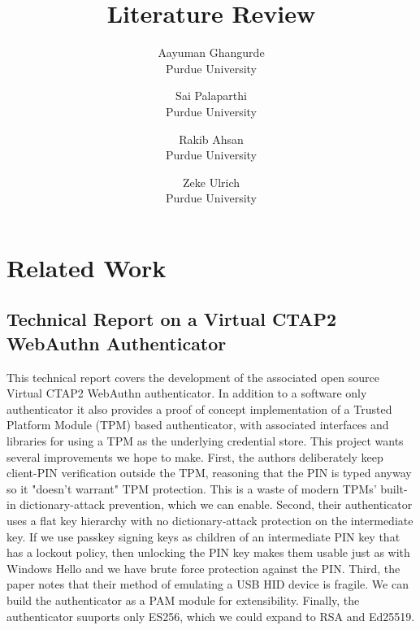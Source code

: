 \documentclass[letterpaper,twocolumn,10pt]{article}
\begin{document}

\date{}

\title{\Large \bf Literature Review}

\author{
  {\rm Aayuman Ghangurde}\\
  Purdue University
  \and
  {\rm Sai Palaparthi}\\
  Purdue University
  \and
  {\rm Rakib Ahsan}\\
  Purdue University
  \and
  {\rm Zeke Ulrich}\\
  Purdue University
}

\maketitle

\section{Related Work}

\subsection{Technical Report on a Virtual CTAP2 WebAuthn Authenticator~\cite{culnane2021virtualctap2webauthn}}

This technical report covers the development of the associated open source
Virtual CTAP2 WebAuthn authenticator. In addition to
a software only authenticator it also provides a proof of concept implementation
of a Trusted Platform Module (TPM) based authenticator, with associated
interfaces and libraries for using a TPM as the underlying credential store.
This project wants several improvements we hope to make.
First, the authors deliberately keep client-PIN verification outside
the TPM, reasoning that the PIN is typed
anyway so it "doesn't warrant" TPM protection. This is a waste of
modern TPMs' built-in dictionary-attack prevention, which we can enable.
Second, their authenticator uses a flat key hierarchy with no dictionary-attack
protection on the intermediate key. If we use passkey signing keys
as children of an intermediate PIN key that has a lockout policy,
then unlocking the PIN key makes them usable just as with Windows
Hello and we have brute force protection against the PIN.
Third, the paper notes that their method of emulating a USB HID device
is fragile. We can build the authenticator as a PAM module for
extensibility.
Finally, the authenticator suuports only ES256, which we could expand to
RSA and Ed25519.
\end{document}
